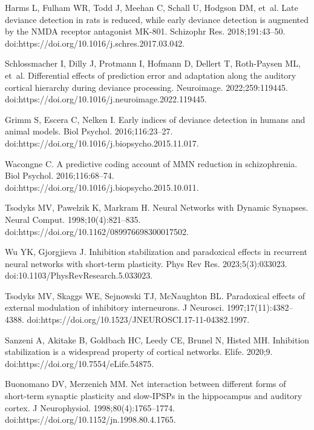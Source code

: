 \documentclass[10pt,letterpaper]{article}
\begin{document}
\begin{thebibliography}{100}
  Harms L, Fulham WR, Todd J, Meehan C, Schall U, Hodgson DM, et~al.
  \newblock Late deviance detection in rats is reduced, while early deviance
    detection is augmented by the {NMDA} receptor antagonist {MK-801}.
  \newblock Schizophr Res. 2018;191:43--50.
  \newblock doi:{https://doi.org/10.1016/j.schres.2017.03.042}.
  
  Schlossmacher I, Dilly J, Protmann I, Hofmann D, Dellert T, Roth-Paysen ML,
    et~al.
  \newblock Differential effects of prediction error and adaptation along the
    auditory cortical hierarchy during deviance processing.
  \newblock Neuroimage. 2022;259:119445.
  \newblock doi:{https://doi.org/10.1016/j.neuroimage.2022.119445}.
  
  Grimm S, Escera C, Nelken I.
  \newblock Early indices of deviance detection in humans and animal models.
  \newblock Biol Psychol. 2016;116:23--27.
  \newblock doi:{https://doi.org/10.1016/j.biopsycho.2015.11.017}.
  
  Wacongne C.
  \newblock A predictive coding account of {MMN} reduction in schizophrenia.
  \newblock Biol Psychol. 2016;116:68--74.
  \newblock doi:{https://doi.org/10.1016/j.biopsycho.2015.10.011}.
  
  Tsodyks MV, Pawelzik K, Markram H.
  \newblock Neural {Networks} with {Dynamic} {Synapses}.
  \newblock Neural Comput. 1998;10(4):821--835.
  \newblock doi:{https://doi.org/10.1162/089976698300017502}.
  
  Wu YK, Gjorgjieva J.
  \newblock Inhibition stabilization and paradoxical effects in recurrent neural
    networks with short-term plasticity.
  \newblock Phys Rev Res. 2023;5(3):033023.
  \newblock doi:{10.1103/PhysRevResearch.5.033023}.
  
  Tsodyks MV, Skaggs WE, Sejnowski TJ, McNaughton BL.
  \newblock Paradoxical effects of external modulation of inhibitory
    interneurons.
  \newblock J Neurosci. 1997;17(11):4382--4388.
  \newblock doi:{https://doi.org/10.1523/JNEUROSCI.17-11-04382.1997}.
  
  Sanzeni A, Akitake B, Goldbach HC, Leedy CE, Brunel N, Histed MH.
  \newblock Inhibition stabilization is a widespread property of cortical
    networks.
  \newblock Elife. 2020;9.
  \newblock doi:{https://doi.org/10.7554/eLife.54875}.
  
  Buonomano DV, Merzenich MM.
  \newblock Net interaction between different forms of short-term synaptic
    plasticity and {slow-IPSPs} in the hippocampus and auditory cortex.
  \newblock J Neurophysiol. 1998;80(4):1765--1774.
  \newblock doi:{https://doi.org/10.1152/jn.1998.80.4.1765}.
  

\end{thebibliography}
\end{document}
